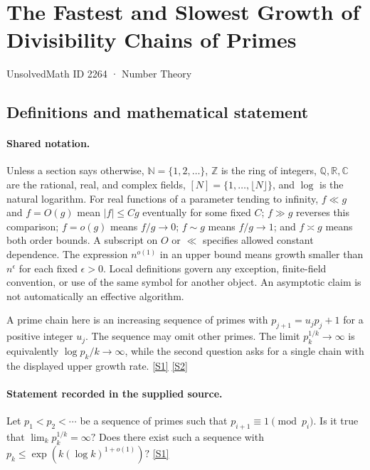 \documentclass[11pt,a4paper]{article}
\newcommand{\N}{\mathbb{N}}
\newcommand{\Z}{\mathbb{Z}}
\newcommand{\Q}{\mathbb{Q}}
\newcommand{\R}{\mathbb{R}}
\newcommand{\C}{\mathbb{C}}
\newcommand{\sref}[2]{\hyperlink{source:#1:#2}{[S#2]}}
\begin{document}

\setcounter{section}{2263}

\section{The Fastest and Slowest Growth of Divisibility Chains of Primes}\label{2264}

{\small\sffamily UnsolvedMath ID 2264 · Number Theory}

\subsection{Definitions and mathematical statement}

\paragraph{Shared notation.}Unless a section says otherwise, $\N=\{1,2,\ldots\}$,
$\Z$ is the ring of integers, $\Q,\R,\C$ are the rational, real, and complex
fields, $[N]=\{1,\ldots,\lfloor N\rfloor\}$, and $\log$ is the natural
logarithm. For real functions of a parameter tending to infinity,
$f\ll g$ and $f=O(g)$ mean $|f|\leq Cg$ eventually for some fixed $C$;
$f\gg g$ reverses this comparison; $f=o(g)$ means $f/g\to0$;
$f\sim g$ means $f/g\to1$; and $f\asymp g$ means both order bounds.
A subscript on $O$ or $\ll$ specifies allowed constant dependence.
The expression $n^{o(1)}$ in an upper bound means growth smaller than
$n^\epsilon$ for each fixed $\epsilon>0$. Local definitions govern any
exception, finite-field convention, or use of the same symbol for another
object. An asymptotic claim is not automatically an effective algorithm.



A prime chain here is an increasing sequence of primes with $p_{j+1}=u_jp_j+1$ for a positive integer $u_j$. The sequence may omit other primes. The limit $p_k^{1/k}\to\infty$ is equivalently $\log p_k/k\to\infty$, while the second question asks for a single chain with the displayed upper growth rate. \sref{2264}{1} \sref{2264}{2}

\paragraph{Statement recorded in the supplied source.}
Let $p_1<p_2<\cdots$ be a sequence of primes such that $p_{i+1}\equiv 1\pmod{p_i}$. Is it true that $ \lim_k p_k^{1/k}=\infty? $ Does there exist such a sequence with $ p_k \leq \exp(k(\log k)^{1+o(1)})? $ \sref{2264}{1}
\end{document}
